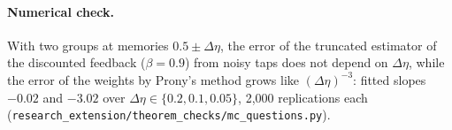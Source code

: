 \paragraph{Numerical check.} With two groups at memories $0.5\pm\Delta\eta$, the error of the truncated estimator of the discounted feedback ($\beta=0.9$) from noisy taps does not depend on $\Delta\eta$, while the error of the weights by Prony's method grows like $(\Delta\eta)^{-3}$: fitted slopes $-0.02$ and $-3.02$ over $\Delta\eta\in\{0.2,0.1,0.05\}$, 2,000 replications each (\nolinkurl{research_extension/theorem_checks/mc_questions.py}).
